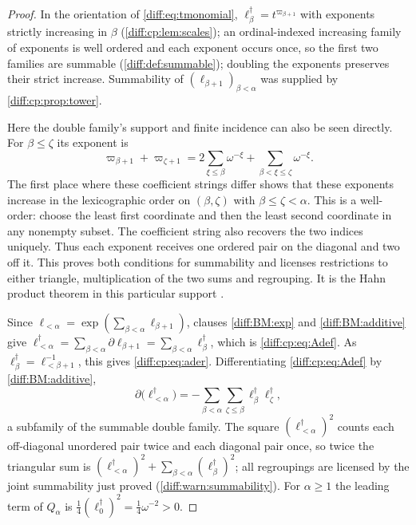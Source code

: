\documentclass[11pt,letterpaper]{article}
\numberwithin{equation}{section}
\theoremstyle{definition}
\theoremstyle{remark}
\newcommand{\der}{\partial}
\begin{document}
\begin{proof}
In the orientation of \cref{diff:eq:tmonomial},
$\ell_{\beta}^{\dagger}=t^{\varpi_{\beta+1}}$ with exponents strictly increasing
in $\beta$ (\cref{diff:cp:lem:scales}); an ordinal-indexed increasing family of
exponents is well ordered and each exponent occurs once, so the first two
families are summable (\cref{diff:def:summable}); doubling the
exponents preserves their strict increase. Summability of
$(\ell_{\beta+1})_{\beta<\alpha}$ was supplied by
\cref{diff:cp:prop:tower}.

Here the double family's support and finite incidence can also be
seen directly. For $\beta\leq\zeta$ its exponent is
\[
 \varpi_{\beta+1}+\varpi_{\zeta+1}
 =2\sum_{\xi\leq\beta}\omega^{-\xi}
   +\sum_{\beta<\xi\leq\zeta}\omega^{-\xi}.
\]
The first place where these coefficient strings differ shows that
these exponents increase in the lexicographic order on
$(\beta,\zeta)$ with $\beta\leq\zeta<\alpha$. This is a well-order:
choose the least first coordinate and then the least second
coordinate in any nonempty subset. The coefficient string also
recovers the two indices uniquely. Thus each exponent receives
one ordered pair on the diagonal and two off it. This proves both
conditions for summability and licenses restrictions to either
triangle, multiplication of the two sums and regrouping. It is
the Hahn product theorem in this particular support
\cite[Section~2.4]{BM}.

Since $\ell_{<\alpha}=\exp(\sum_{\beta<\alpha}\ell_{\beta+1})$,
clauses \ref{diff:BM:exp} and \ref{diff:BM:additive} give
$\ell_{<\alpha}^{\dagger}=\sum_{\beta<\alpha}\der\ell_{\beta+1}
=\sum_{\beta<\alpha}\ell_{\beta}^{\dagger}$, which is \cref{diff:cp:eq:Adef}.
As $\ell_{\beta}^{\dagger}=\ell_{<\beta+1}^{-1}$, this gives
\cref{diff:cp:eq:ader}. Differentiating \cref{diff:cp:eq:Adef} by
\ref{diff:BM:additive},
\[
 \der\bigl(\ell_{<\alpha}^{\dagger}\bigr)
 =-\sum_{\beta<\alpha}\sum_{\zeta\leq\beta}\ell_{\beta}^{\dagger}\ell_{\zeta}^{\dagger},
\]
a subfamily of the summable double family. The square
$(\ell_{<\alpha}^{\dagger})^{2}$ counts each off-diagonal unordered pair twice and
each diagonal pair once, so twice the triangular sum is
$(\ell_{<\alpha}^{\dagger})^{2}+\sum_{\beta<\alpha}(\ell_{\beta}^{\dagger})^{2}$;
all regroupings are licensed by the joint summability just proved
(\cref{diff:warn:summability}). For $\alpha\geq1$ the leading term of
$Q_{\alpha}$ is $\frac14(\ell_{0}^{\dagger})^{2}=\frac14\omega^{-2}>0$.
\end{proof}
\end{document}
